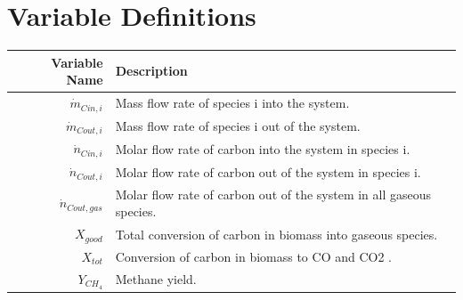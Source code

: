 \documentclass[11pt,twocolumn]{article}
\begin{document}
\section{Variable Definitions}
\begin{center}
	\begin{tabular}{rl}
	Variable Name			&	Description	\\
	\hline
	$\dot{m}_{C in,i}$		&	Mass flow rate of species i into the system.	\\
	$\dot{m}_{C out, i}$	&	Mass flow rate of species i out of the system.	\\
	$\dot{n}_{C in, i}$		&	Molar flow rate of carbon into the system in species i.	\\
	$\dot{n}_{C out, i}$		&	Molar flow rate of carbon out of the system in species i.	\\
	$\dot{n}_{C out, gas}$	&	Molar flow rate of carbon out of the system in all gaseous species.	\\
	$X_{good}$			&	Total conversion of carbon in biomass into gaseous species.	\\
	$X_{tot}$				&	Conversion of carbon in biomass to CO and CO2 .	\\
	$Y_{CH_4}$			&	Methane yield.	\\
	\end{tabular}
\end{center}
\end{document}
